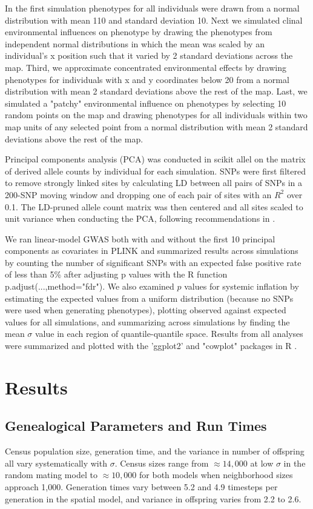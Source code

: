 \documentclass[9pt,twocolumn,twoside,lineno]{gsajnl}
\begin{document}
In the first simulation phenotypes for all individuals were drawn from a normal distribution with mean 110 and standard deviation 10. Next we simulated clinal environmental influences on phenotype by drawing the phenotypes from independent normal distributions in which the mean was scaled by an individual's x position such that it varied by 2 standard deviations across the map. Third, we approximate concentrated environmental effects by drawing phenotypes for individuals with x and y coordinates below 20 from a normal distribution with mean 2 standard deviations above the rest of the map. Last, we simulated a "patchy" environmental influence on phenotypes by selecting 10 random points on the map and drawing phenotypes for all individuals within two map units of any selected point from a normal distribution with mean 2 standard deviations above the rest of the map. 

Principal components analysis (PCA) was conducted in scikit allel on the matrix of derived allele counts by individual for each simulation. SNPs were first filtered to remove strongly linked sites by calculating LD between all pairs of SNPs in a 200-SNP moving window and dropping one of each pair of sites with an $R^2$ over 0.1. The LD-pruned allele count matrix was then centered and all sites scaled to unit variance when conducting the PCA, following recommendations in \citep{Patterson2006}.   

We ran linear-model GWAS both with and without the first 10 principal components as covariates in PLINK and summarized results across simulations by counting the number of significant SNPs with an expected false positive rate of less than 5\% after adjusting p values with the R function p.adjust(...,method="fdr"). We also examined $p$ values for systemic inflation by estimating the expected values from a uniform distribution (because no SNPs were used when generating phenotypes), plotting observed against expected values for all simulations, and summarizing across simulations by finding the mean $\sigma$ value in each region of quantile-quantile space. Results from all analyses were summarized and plotted with the 'ggplot2' \citep{Wickham2016} and "cowplot" \citep{Wilke2019} packages in R \citep{Rcore2018}. 

\section{Results}

\subsection{Genealogical Parameters and Run Times}
Census population size, generation time, and the variance in number of offspring all vary systematically with $\sigma$. Census sizes range from $\approx 14,000$ at low $\sigma$ in the random mating model to $\approx 10,000$ for both models when neighborhood sizes approach 1,000. Generation times vary between 5.2 and 4.9 timesteps per generation in the spatial model, and variance in offspring varies from 2.2 to 2.6. 
\end{document}
